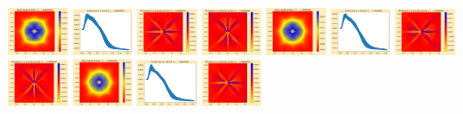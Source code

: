 \documentclass[11pt]{article}
\begin{document}
\vskip 10pt 
\includegraphics[width=0.11875\textwidth]{frame0016fig0.png}
\includegraphics[width=0.11875\textwidth]{frame0016fig1.png}
\includegraphics[width=0.11875\textwidth]{frame0016fig2.png}
\includegraphics[width=0.11875\textwidth]{frame0016fig3.png}
\includegraphics[width=0.11875\textwidth]{frame0017fig0.png}
\includegraphics[width=0.11875\textwidth]{frame0017fig1.png}
\includegraphics[width=0.11875\textwidth]{frame0017fig2.png}
\includegraphics[width=0.11875\textwidth]{frame0017fig3.png}
\vskip 10pt 
\includegraphics[width=0.11875\textwidth]{frame0018fig0.png}
\includegraphics[width=0.11875\textwidth]{frame0018fig1.png}
\includegraphics[width=0.11875\textwidth]{frame0018fig2.png}
\end{document}
